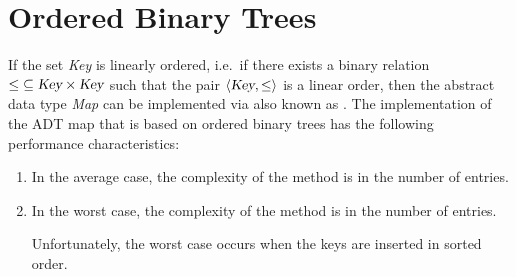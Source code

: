 \section{Ordered Binary Trees}
If the set \textsl{Key} is linearly ordered, i.e.~if there exists a binary relation
$\leq \;\subseteq\textsl{Key}\times\textsl{Key}$ such that the pair $\langle \textsl{Key}, \leq \rangle$ is a linear
order, then the abstract data type \textsl{Map} can be implemented via  
\href{https://en.wikipedia.org/wiki/Binary_search_tree}{} also known as
. 
The implementation of the ADT map that is based on ordered binary trees has the following performance
characteristics: 
\begin{enumerate}
\item In the average case, the complexity of the method  is  in the number of entries.
\item In the worst case, the complexity of the method  is  in the number of entries.

      Unfortunately, the worst case occurs when the keys are inserted in sorted order.
\end{enumerate}


